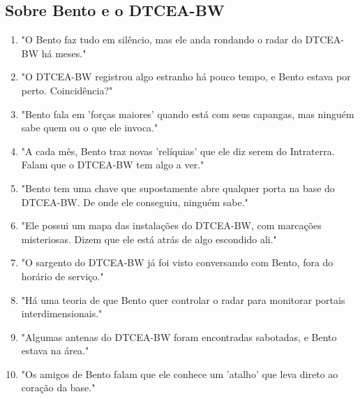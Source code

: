 \subsection*{Sobre Bento e o DTCEA-BW}
\begin{enumerate}
    \item "O Bento faz tudo em silêncio, mas ele anda rondando o radar do DTCEA-BW há meses."
    \item "O DTCEA-BW registrou algo estranho há pouco tempo, e Bento estava por perto. Coincidência?"
    \item "Bento fala em 'forças maiores' quando está com seus capangas, mas ninguém sabe quem ou o que ele invoca."
    \item "A cada mês, Bento traz novas 'relíquias' que ele diz serem do Intraterra. Falam que o DTCEA-BW tem algo a ver."
    \item "Bento tem uma chave que supostamente abre qualquer porta na base do DTCEA-BW. De onde ele conseguiu, ninguém sabe."
    \item "Ele possui um mapa das instalações do DTCEA-BW, com marcações misteriosas. Dizem que ele está atrás de algo escondido ali."
    \item "O sargento do DTCEA-BW já foi visto conversando com Bento, fora do horário de serviço."
    \item "Há uma teoria de que Bento quer controlar o radar para monitorar portais interdimensionais."
    \item "Algumas antenas do DTCEA-BW foram encontradas sabotadas, e Bento estava na área."
    \item "Os amigos de Bento falam que ele conhece um 'atalho' que leva direto ao coração da base."
\end{enumerate}

